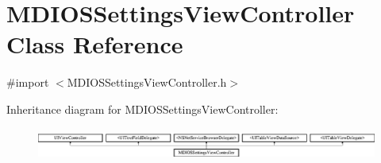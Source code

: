 \hypertarget{interface_m_d_i_o_s_settings_view_controller}{\section{M\-D\-I\-O\-S\-Settings\-View\-Controller Class Reference}
\label{interface_m_d_i_o_s_settings_view_controller}
}


{\ttfamily \#import $<$M\-D\-I\-O\-S\-Settings\-View\-Controller.\-h$>$}

Inheritance diagram for M\-D\-I\-O\-S\-Settings\-View\-Controller\-:\begin{figure}[H]
\begin{center}
\leavevmode
\includegraphics[height=1.061611cm]{interface_m_d_i_o_s_settings_view_controller}
\end{center}
\end{figure}
